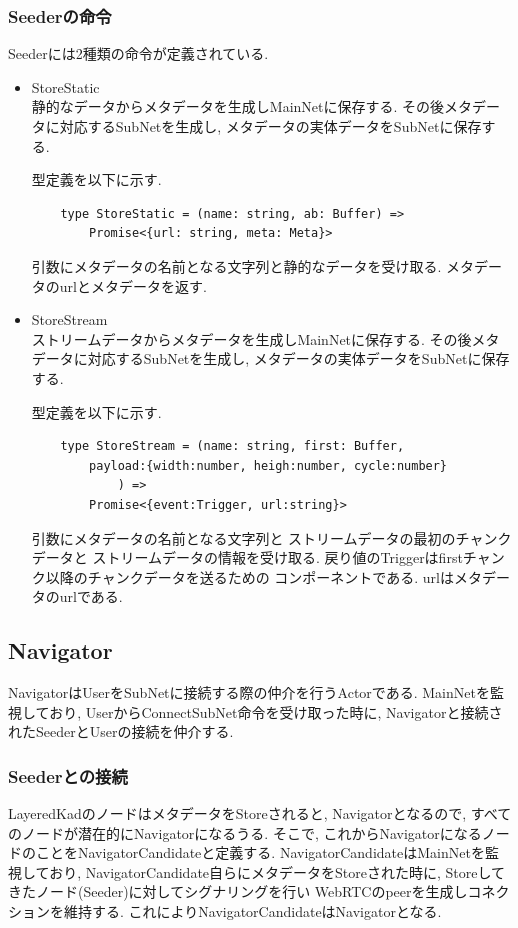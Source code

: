 \documentclass[sotsuron]{jcsie}
\begin{document}
\subsubsection{Seederの命令}
Seederには2種類の命令が定義されている.
\begin{itemize}
	\item{StoreStatic} \\
	静的なデータからメタデータを生成しMainNetに保存する.
	その後メタデータに対応するSubNetを生成し, 
	メタデータの実体データをSubNetに保存する.
					
	型定義を以下に示す.
	\begin{lstlisting}
	type StoreStatic = (name: string, ab: Buffer) =>
		Promise<{url: string, meta: Meta}>
	\end{lstlisting}
					
	引数にメタデータの名前となる文字列と静的なデータを受け取る.
	メタデータのurlとメタデータを返す.
				
	\item {StoreStream}\\
	      ストリームデータからメタデータを生成しMainNetに保存する.
	      その後メタデータに対応するSubNetを生成し, 
	      メタデータの実体データをSubNetに保存する.
	      	      	      	      
	      型定義を以下に示す.
	      \begin{lstlisting}
	type StoreStream = (name: string, first: Buffer, 
		payload:{width:number, heigh:number, cycle:number}
			) =>
		Promise<{event:Trigger, url:string}>
	      \end{lstlisting}
	      	      	      	      
	      引数にメタデータの名前となる文字列と
	      ストリームデータの最初のチャンクデータと
	      ストリームデータの情報を受け取る.
	      戻り値のTriggerはfirstチャンク以降のチャンクデータを送るための
	      コンポーネントである. urlはメタデータのurlである.
\end{itemize}

\subsection{Navigator}
NavigatorはUserをSubNetに接続する際の仲介を行うActorである.
MainNetを監視しており, UserからConnectSubNet命令を受け取った時に, 
Navigatorと接続されたSeederとUserの接続を仲介する.

\subsubsection{Seederとの接続}
LayeredKadのノードはメタデータをStoreされると, Navigatorとなるので, 
すべてのノードが潜在的にNavigatorになるうる.
そこで, これからNavigatorになるノードのことをNavigatorCandidateと定義する.
NavigatorCandidateはMainNetを監視しており, 
NavigatorCandidate自らにメタデータをStoreされた時に, 
Storeしてきたノード(Seeder)に対してシグナリングを行い
WebRTCのpeerを生成しコネクションを維持する.
これによりNavigatorCandidateはNavigatorとなる.
\end{document}

